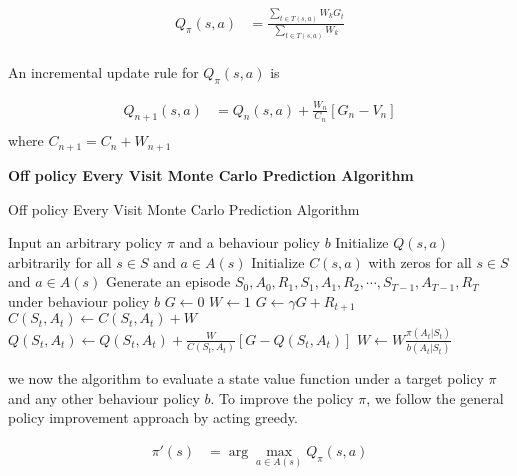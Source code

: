 \documentclass[../main.tex]{subfiles}
\begin{document}
\begin{equation}
    \begin{aligned}
    Q_\pi(s,a) &= \frac{\sum_{t \in T(s,a) } W_kG_t}{\sum_{t \in T(s,a) } W_k} \nonumber\\
    \end{aligned}
\end{equation}

An incremental update rule for $Q_\pi(s,a)$ is

\begin{equation}
    \begin{aligned}
    Q_{n+1}(s,a) &= Q_n(s,a) + \frac{W_n}{C_n} \left[G_n - V_n\right]  \nonumber\\
    \end{aligned}
\end{equation}
where $C_{n+1} = C_n + W_{n+1}$

\textbf{Off policy Every Visit Monte Carlo Prediction Algorithm}

\begin{algorithm}[H]
\caption{Off policy Every Visit Monte Carlo Prediction Algorithm}
\label{alg:off-policy-every-visit-monte-carlo-prediction}
\begin{algorithmic}[1]
\State Input an arbitrary policy $\pi$ and a behaviour policy $b$
\State Initialize $Q(s,a)$ arbitrarily for all $s \in S$ and $a \in A(s)$
\State Initialize $C(s,a)$ with zeros for all $s \in S$ and $a \in A(s)$
\State Generate an episode $S_0, A_0, R_1, S_1, A_1, R_2, \cdots, S_{T-1}, A_{T-1}, R_{T}$ under behaviour policy $b$
\State $G \leftarrow 0$
\State $W \leftarrow 1$
\State $G \leftarrow \gamma G + R_{t+1}$
\State $C(S_t, A_t) \leftarrow C(S_t, A_t) + W$
\State $Q(S_t, A_t) \leftarrow Q(S_t, A_t) + \frac{W}{C(S_t, A_t)} \left[G - Q(S_t, A_t)\right]$
\State $W \leftarrow W \frac{\pi(A_t|S_t)}{b(A_t|S_t)}$
\EndFor
\EndWhile

\end{algorithmic}
\end{algorithm}

we now the algorithm to evaluate a state value function under a target policy $\pi$ and any other behaviour policy $b$. To improve the policy $\pi$, we follow the general policy improvement approach by acting greedy.

\begin{equation}
    \begin{aligned}
    \pi'(s) &= \arg\max_{a \in A(s)} Q_\pi(s,a) \nonumber\\
    \end{aligned}
\end{equation}
\end{document}
